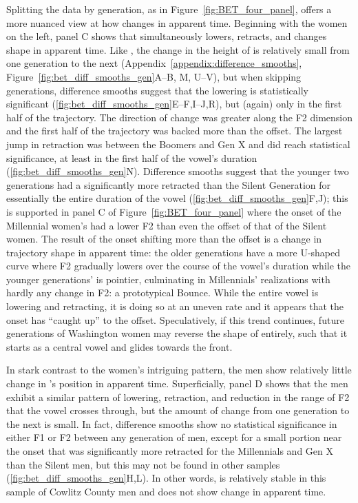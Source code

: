 Splitting the data by generation, as in Figure~\ref{fig:BET_four_panel}, offers a more nuanced view at how \bet changes in apparent time. Beginning with the women on the left, panel C shows that \bet simultaneously lowers, retracts, and changes shape in apparent time. Like \bat, the change in the height of \bet is relatively small from one generation to the next (Appendix~\ref{appendix:difference_smooths}, Figure~\ref{fig:bet_diff_smooths_gen}A--B, M, U--V), but when skipping generations, difference smooths suggest that the lowering is statistically significant (\ref{fig:bet_diff_smooths_gen}E--F,I--J,R), but (again) only in the first half of the trajectory. The direction of change was greater along the F2 dimension and the first half of the trajectory was backed more than the offset. The largest jump in \bet retraction was between the Boomers and Gen X and did reach statistical significance, at least in the first half of the vowel's duration (\ref{fig:bet_diff_smooths_gen}N). Difference smooths suggest that the younger two generations had a significantly more retracted \bet than the Silent Generation for essentially the entire duration of the vowel (\ref{fig:bet_diff_smooths_gen}F,J); this is supported in panel C of Figure~\ref{fig:BET_four_panel} where the onset of the Millennial women's \bet had a lower F2 than even the offset of that of the Silent women. The result of the onset shifting more than the offset is a change in trajectory shape in apparent time: the older generations have a more U-shaped curve where F2 gradually lowers over the course of the vowel's duration while the younger generations' \bet is pointier, culminating in Millennials' realizations with hardly any change in F2: a prototypical Bounce. While the entire vowel is lowering and retracting, it is doing so at an uneven rate and it appears that the onset has ``caught up'' to the offset. Speculatively, if this trend continues, future generations of Washington women may reverse the shape of \bet entirely, such that it starts as a central vowel and glides towards the front.

In stark contrast to the women's intriguing pattern, the men show relatively little change in \bet's position in apparent time. Superficially, panel D shows that the men exhibit a similar pattern of lowering, retraction, and reduction in the range of F2 that the vowel crosses through, but the amount of change from one generation to the next is small. In fact, difference smooths show no statistical significance in either F1 or F2 between any generation of men, except for a small portion near the onset that was significantly more retracted for the Millennials and Gen X than the Silent men, but this may not be found in other samples (\ref{fig:bet_diff_smooths_gen}H,L). In other words, \bet is relatively stable in this sample of Cowlitz County men and does not show change in apparent time.


